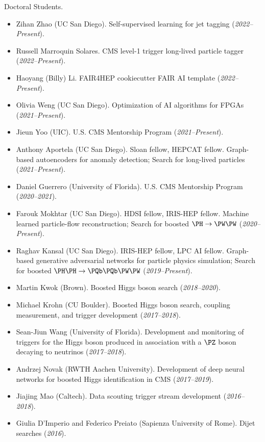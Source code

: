 \documentclass[11pt]{res}
\begin{document}
\begin{resume}
  Doctoral Students.
  \begin{itemize}
    \itemsep-0.3em
    \item Zihan Zhao (UC San Diego). Self-supervised learning for jet tagging (\textit{2022--Present}).
    \item Russell Marroquin Solares. CMS level-1 trigger long-lived particle tagger (\textit{2022--Present}).
    \item Haoyang (Billy) Li. FAIR4HEP cookiecutter FAIR AI template (\textit{2022--Present}).
    \item Olivia Weng (UC San Diego). Optimization of AI algorithms for FPGAs (\textit{2021--Present}).
    \item Jieun Yoo (UIC). U.S. CMS Mentorship Program (\textit{2021--Present}).
    \item Anthony Aportela (UC San Diego). Sloan fellow, HEPCAT fellow. Graph-based autoencoders for anomaly detection; Search for long-lived particles (\textit{2021--Present}).
    \item Daniel Guerrero (University of Florida). U.S. CMS Mentorship Program (\textit{2020--2021}).
    \item Farouk Mokhtar (UC San Diego). HDSI fellow, IRIS-HEP fellow. Machine learned particle-flow reconstruction; Search for boosted $\PH\to\PW\PW$ (\textit{2020--Present}).
    \item Raghav Kansal (UC San Diego). IRIS-HEP fellow, LPC AI fellow. Graph-based generative adversarial networks for particle physics simulation; Search for boosted $\PH\PH\to\PQb\PQb\PW\PW$ (\textit{2019--Present}).
    \item Martin Kwok (Brown). Boosted Higgs boson search (\textit{2018--2020}).
    \item Michael Krohn (CU Boulder). Boosted Higgs boson search, coupling measurement, and trigger development (\textit{2017--2018}).
    \item Sean-Jiun Wang (University of Florida). Development and monitoring of triggers for the Higgs boson produced in association with a $\PZ$ boson decaying to neutrinos (\textit{2017--2018}).
    \item Andrzej Novak (RWTH Aachen University). Development of deep neural networks for boosted Higgs identification in CMS (\textit{2017--2019}).
    \item Jiajing Mao (Caltech). Data scouting trigger stream development (\textit{2016--2018}).
    \item Giulia D'Imperio and Federico Preiato (Sapienza University of Rome). Dijet searches (\textit{2016}).
  \end{itemize}


\end{resume}
\end{document}
